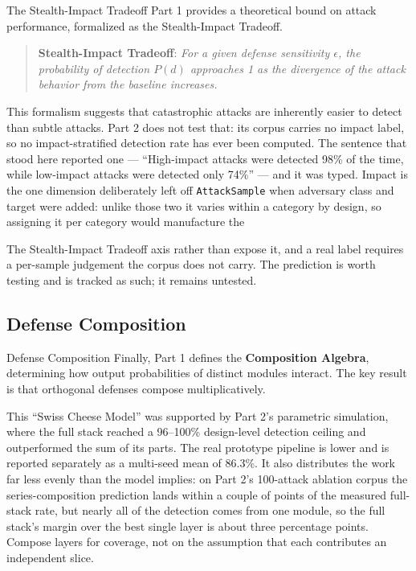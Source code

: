 \documentclass[
  ignorenonframetext,
]{beamer}
\begin{document}
\begin{frame}{The Stealth-Impact Tradeoff}
Part 1 provides a theoretical bound on attack performance, formalized as
the Stealth-Impact Tradeoff.

\begin{quote}
\textbf{Stealth-Impact Tradeoff}: \emph{For a given defense sensitivity
\(\epsilon\), the probability of detection \(P(d)\) approaches 1 as the
divergence of the attack behavior from the baseline increases.}
\end{quote}

This formalism suggests that catastrophic attacks are inherently easier
to detect than subtle attacks. Part 2 does not test that: its corpus
carries no impact label, so no impact-stratified detection rate has ever
been computed. The sentence that stood here reported one ---
``High-impact attacks were detected 98\% of the time, while low-impact
attacks were detected only 74\%'' --- and it was typed. Impact is the
one dimension deliberately left off \texttt{AttackSample} when adversary
class and target were added: unlike those two it varies within a
category by design, so assigning it per category would manufacture the
\end{frame}

\begin{frame}{The Stealth-Impact Tradeoff}
axis rather than expose it, and a real label requires a per-sample
judgement the corpus does not carry. The prediction is worth testing and
is tracked as such; it remains untested.
\end{frame}

\subsection{Defense Composition}\label{sec:composition-review}

\begin{frame}[allowframebreaks]{Defense Composition}
Finally, Part 1 defines the \textbf{Composition Algebra}, determining
how output probabilities of distinct modules interact. The key result is
that orthogonal defenses compose multiplicatively.

This ``Swiss Cheese Model'' was supported by Part 2's parametric
simulation, where the full stack reached a 96--100\% design-level
detection ceiling and outperformed the sum of its parts. The real
prototype pipeline is lower and is reported separately as a multi-seed
mean of 86.3\%. It also distributes the work far less evenly than the
model implies: on Part 2's 100-attack ablation corpus the
series-composition prediction lands within a couple of points of the
measured full-stack rate, but nearly all of the detection comes from one
module, so the full stack's margin over the best single layer is about
three percentage points. Compose layers for coverage, not on the
assumption that each contributes an independent slice.
\end{frame}
\end{document}
